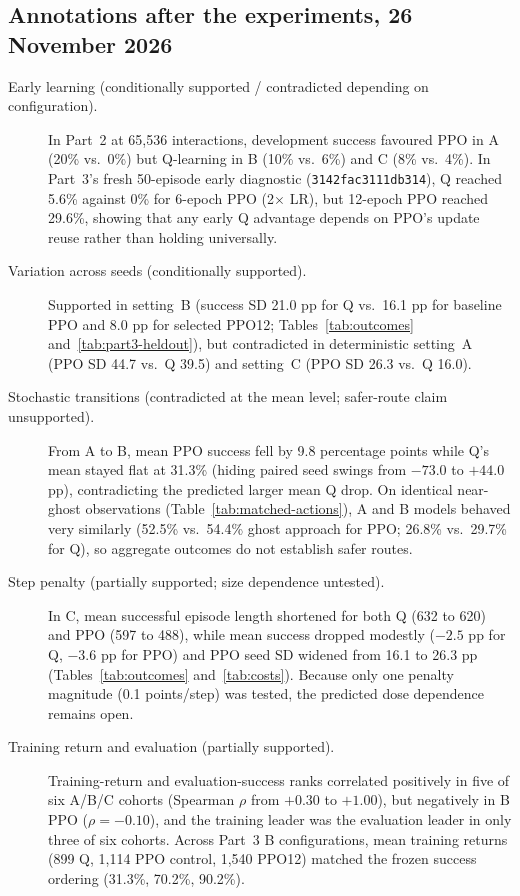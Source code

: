 \subsection*{Annotations after the experiments, 26 November 2026}

\begin{description}
  \item[Early learning (conditionally supported / contradicted depending on configuration).]
  In Part~2 at 65,536 interactions, development success favoured PPO in A (20\% vs.\ 0\%)
  but Q-learning in B (10\% vs.\ 6\%) and C (8\% vs.\ 4\%). In Part~3's fresh 50-episode
  early diagnostic (\texttt{3142fac3111db314}), Q reached 5.6\% against 0\% for 6-epoch
  PPO (2$\times$ LR), but 12-epoch PPO reached 29.6\%, showing that any early Q advantage
  depends on PPO's update reuse rather than holding universally.

  \item[Variation across seeds (conditionally supported).]
  Supported in setting~B (success SD 21.0 pp for Q vs.\ 16.1 pp for baseline PPO and
  8.0 pp for selected PPO12; Tables~\ref{tab:outcomes} and~\ref{tab:part3-heldout}),
  but contradicted in deterministic setting~A (PPO SD 44.7 vs.\ Q 39.5) and setting~C
  (PPO SD 26.3 vs.\ Q 16.0).

  \item[Stochastic transitions (contradicted at the mean level; safer-route claim unsupported).]
  From A to B, mean PPO success fell by 9.8 percentage points while Q's mean stayed flat
  at 31.3\% (hiding paired seed swings from $-73.0$ to $+44.0$ pp), contradicting the
  predicted larger mean Q drop. On identical near-ghost observations (Table~\ref{tab:matched-actions}),
  A and B models behaved very similarly (52.5\% vs.\ 54.4\% ghost approach for PPO;
  26.8\% vs.\ 29.7\% for Q), so aggregate outcomes do not establish safer routes.

  \item[Step penalty (partially supported; size dependence untested).]
  In C, mean successful episode length shortened for both Q (632 to 620) and PPO (597 to 488),
  while mean success dropped modestly ($-2.5$ pp for Q, $-3.6$ pp for PPO) and PPO seed SD
  widened from 16.1 to 26.3 pp (Tables~\ref{tab:outcomes} and~\ref{tab:costs}). Because only
  one penalty magnitude (0.1 points/step) was tested, the predicted dose dependence remains open.

  \item[Training return and evaluation (partially supported).]
  Training-return and evaluation-success ranks correlated positively in five of six A/B/C
  cohorts (Spearman $\rho$ from $+0.30$ to $+1.00$), but negatively in B PPO ($\rho=-0.10$),
  and the training leader was the evaluation leader in only three of six cohorts. Across
  Part~3 B configurations, mean training returns (899 Q, 1,114 PPO control, 1,540 PPO12)
  matched the frozen success ordering (31.3\%, 70.2\%, 90.2\%).


\end{description}
